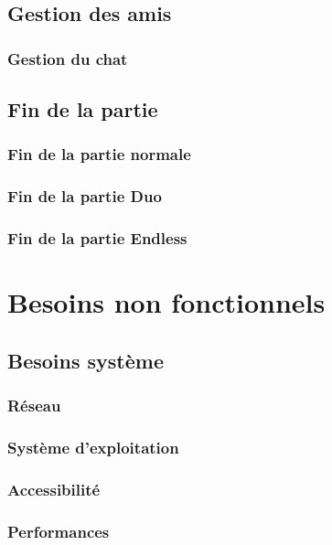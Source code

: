 \documentclass{article}
\begin{document}
\subsection{Gestion des amis}

\subsubsection{Gestion du chat}

\subsection{Fin de la partie}

\subsubsection{Fin de la partie normale}

\subsubsection{Fin de la partie Duo}

\subsubsection{Fin de la partie Endless}

\section{Besoins non fonctionnels}

\subsection{Besoins système}

\subsubsection{Réseau}

\subsubsection{Système d'exploitation}

\subsubsection{Accessibilité}

\subsubsection{Performances}
\end{document}
